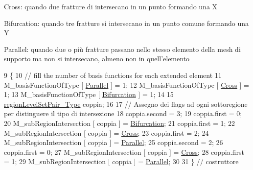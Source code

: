 \begin{DoxyItemize}
\item Cross\-: quando due fratture di intersecano in un punto formando una X
\item Bifurcation\-: quando tre fratture si intersecano in un punto comune formando una Y
\item Parallel\-: quando due o più fratture passano nello stesso elemento della mesh di supporto ma non si intersecano, almeno non in quell'elemento
\end{DoxyItemize}
\begin{DoxyCode}
9 \{
10     \textcolor{comment}{// fill the number of basis functions for each extended element}
11     M\_basisFunctionOfType [ \hyperlink{classFractureIntersect_a9a4e4a784fa4c8e359767ed543f89dc5ad91760e1506b52a828bc401490f7c92b}{Parallel} ] = 1; 
12     M\_basisFunctionOfType [ \hyperlink{classFractureIntersect_a9a4e4a784fa4c8e359767ed543f89dc5a743fef1af81c0e61412fafb9438b380e}{Cross} ] = 1;
13     M\_basisFunctionOfType [ \hyperlink{classFractureIntersect_a9a4e4a784fa4c8e359767ed543f89dc5a4d466b3d3de0af7e18732b6f765bb1af}{Bifurcation} ] = 1;
14 
15     \hyperlink{classFractureIntersect_aea039e89cb4b4314c25c7a362641f40e}{regionLevelSetPair\_Type} coppia;
16     
17     \textcolor{comment}{// Assegno dei flags ad ogni sottoregione per distinguere il tipo di intersezione}
18     coppia.second = 3;
19     coppia.first = 0;
20     M\_subRegionIntersection [ coppia ] = \hyperlink{classFractureIntersect_a9a4e4a784fa4c8e359767ed543f89dc5a4d466b3d3de0af7e18732b6f765bb1af}{Bifurcation};
21     coppia.first = 1;
22     M\_subRegionIntersection [ coppia ] = \hyperlink{classFractureIntersect_a9a4e4a784fa4c8e359767ed543f89dc5a743fef1af81c0e61412fafb9438b380e}{Cross};
23     coppia.first = 2;
24     M\_subRegionIntersection [ coppia ] = \hyperlink{classFractureIntersect_a9a4e4a784fa4c8e359767ed543f89dc5ad91760e1506b52a828bc401490f7c92b}{Parallel};
25     coppia.second = 2;
26     coppia.first = 0;
27     M\_subRegionIntersection [ coppia ] = \hyperlink{classFractureIntersect_a9a4e4a784fa4c8e359767ed543f89dc5a743fef1af81c0e61412fafb9438b380e}{Cross};
28     coppia.first = 1;
29     M\_subRegionIntersection [ coppia ] = \hyperlink{classFractureIntersect_a9a4e4a784fa4c8e359767ed543f89dc5ad91760e1506b52a828bc401490f7c92b}{Parallel};
30 
31 \} \textcolor{comment}{// costruttore}
\end{DoxyCode}


